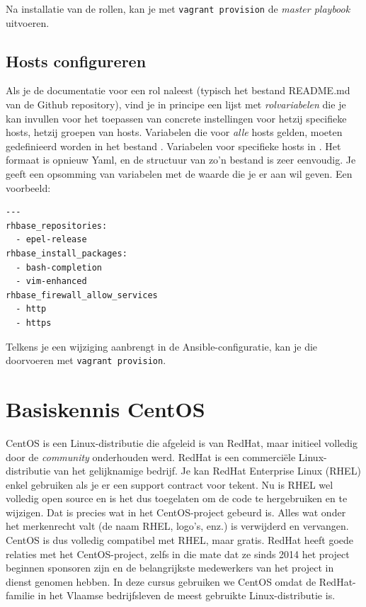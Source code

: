 Na installatie van de rollen, kan je met \texttt{vagrant\ provision} de \emph{master playbook} uitvoeren.

\subsection{Hosts configureren}
\label{sub:hosts-configureren}

Als je de documentatie voor een rol naleest (typisch het bestand README.md van de Github repository), vind je in principe een lijst met \emph{rolvariabelen} die je kan invullen voor het toepassen van concrete instellingen voor hetzij specifieke hosts, hetzij groepen van hosts. Variabelen die voor \emph{alle} hosts gelden, moeten gedefinieerd worden in het bestand . Variabelen voor specifieke hosts in . Het formaat is opnieuw Yaml, en de structuur van zo'n bestand is zeer eenvoudig. Je geeft een opsomming van variabelen met de waarde die je er aan wil geven. Een voorbeeld:

\begin{verbatim}
---
rhbase_repositories:
  - epel-release
rhbase_install_packages:
  - bash-completion
  - vim-enhanced
rhbase_firewall_allow_services
  - http
  - https
\end{verbatim}

Telkens je een wijziging aanbrengt in de Ansible-configuratie, kan je die doorvoeren met \texttt{vagrant\ provision}.

\section{Basiskennis CentOS}
\label{sec:basiskennis_centos}

CentOS is een Linux-distributie die afgeleid is van RedHat, maar initieel volledig door de \emph{community} onderhouden werd. RedHat is een commerciële Linux-distributie van het gelijknamige bedrijf. Je kan RedHat Enterprise Linux (RHEL) enkel gebruiken als je er een support contract voor tekent. Nu is RHEL wel volledig open source en is het dus toegelaten om de code te hergebruiken en te wijzigen. Dat is precies wat in het CentOS-project gebeurd is. Alles wat onder het merkenrecht valt (de naam RHEL, logo's, enz.) is verwijderd en vervangen. CentOS is dus volledig compatibel met RHEL, maar gratis. RedHat heeft goede relaties met het CentOS-project, zelfs in die mate dat ze sinds 2014 het project beginnen sponsoren zijn en de belangrijkste medewerkers van het project in dienst genomen hebben. In deze cursus gebruiken we CentOS omdat de RedHat-familie in het Vlaamse bedrijfsleven de meest gebruikte Linux-distributie is.

